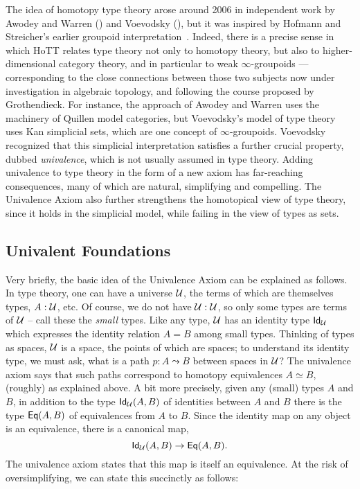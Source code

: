 {The idea of homotopy type theory arose around 2006 in independent work by Awodey and Warren (\cite{AW}) and Voevodsky (\cite{VV}), but it was inspired by 
Hofmann and Streicher's earlier groupoid interpretation~\cite{HofmannM:gromtt}.  Indeed, there is a precise sense in which HoTT relates type theory not only to homotopy theory, but also to higher-dimensional category theory, and in particular to weak $\infty$-groupoids --- corresponding to the close connections between those two subjects now under investigation in algebraic topology, and following the course proposed by Grothendieck.  For instance, the approach of Awodey and Warren uses the machinery of Quillen model categories, but Voevodsky's model of type theory uses Kan simplicial sets, which are one concept of $\infty$-groupoids.  Voevodsky recognized that this simplicial interpretation satisfies a further crucial property, dubbed \emph{univalence},  which is not usually assumed in type theory.  Adding univalence  to type theory in the form of a new axiom has far-reaching consequences, many of which are natural, simplifying and compelling.  The Univalence Axiom also further strengthens the homotopical view of type theory, since it holds in the simplicial model, while failing in the view of types as sets.  

\subsection*{Univalent Foundations}

Very briefly, the basic idea of the Univalence Axiom can be explained as follows.  In type theory, one can have a universe ${\mathcal U}$, the terms of which are themselves types, $A : {\mathcal U}$, etc.  Of course, we do not have ${\mathcal U}:{\mathcal U}$, so only some types are terms of ${\mathcal U}$ -- call these the \emph{small} types.  Like any type, ${\mathcal U}$ has an identity type ${{\sf Id}}_{{\mathcal U}}$ which expresses the identity relation $A = B$ among small types.  Thinking of  types as spaces, ${\mathcal U}$ is a space, the points of which are spaces; to understand its identity type, we must ask, what is a path $p : A \leadsto B$ between spaces in ${\mathcal U}$?  The univalence axiom says that such paths correspond to homotopy equivalences $A\simeq B$, (roughly) as explained above.  A bit more precisely, given any (small) types $A$ and $B$, in addition to the type ${{\sf Id}}_{{\mathcal U}}(A,B)$ of identities between $A$ and $B$ there is the type ${{\sf Eq}}(A,B)$ of equivalences from $A$ to $B$.  Since the identity map on any object is an equivalence, there is a canonical map,
$${{\sf Id}}_{{\mathcal U}}(A,B)\to{{\sf Eq}}(A,B).$$
The univalence axiom states that this map is itself an equivalence.  At the risk of oversimplifying, we can state this succinctly as follows:

}

